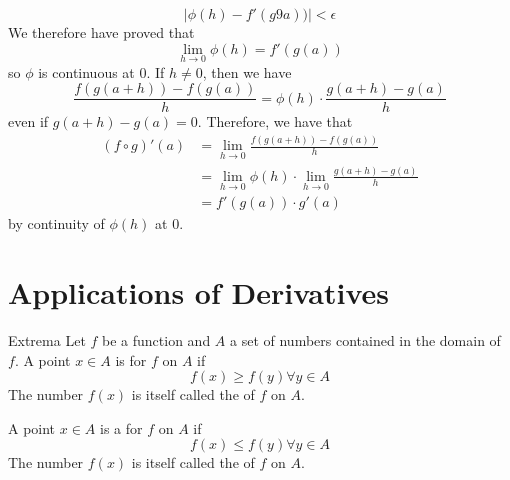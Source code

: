 \documentclass[12pt]{report}
\begin{document}
\begin{proof*}{}{}
\begin{equation*}
        |\phi(h) - f'(g9a))| < \epsilon
    \end{equation*}
    We therefore have proved that \begin{equation*}
        \lim\limits_{h\rightarrow 0}\phi(h) = f'(g(a))
    \end{equation*}
    so $\phi$ is continuous at $0$. If $h \neq 0$, then we have $$\frac{f(g(a+h)) - f(g(a))}{h} = \phi(h)\cdot \frac{g(a+h)-g(a)}{h}$$
    even if $g(a+h)-g(a) = 0$. Therefore, we have that \begin{align*}
        (f\circ g)'(a) &= \lim\limits_{h\rightarrow 0}\frac{f(g(a+h)) - f(g(a))}{h} \\
        &= \lim\limits_{h\rightarrow 0}\phi(h)\cdot \lim\limits_{h\rightarrow 0}\frac{g(a+h)-g(a)}{h} \\
        &= f'(g(a))\cdot g'(a) 
    \end{align*}
    by continuity of $\phi(h)$ at $0$.
\end{proof*}



\section{Applications of Derivatives}

\begin{defn}{Extrema}{}
    Let $f$ be a function and $A$ a set of numbers contained in the domain of $f$. A point $x \in A$ is  for $f$ on $A$ if \begin{equation}
        f(x) \geq f(y) \forall y \in A
    \end{equation}
    The number $f(x)$ is itself called the  of $f$ on $A$.

    A point $x \in A$ is a  for $f$ on $A$ if \begin{equation}
        f(x) \leq f(y) \forall y \in A
    \end{equation}
    The number $f(x)$ is itself called the  of $f$ on $A$.
\end{defn}
\end{document}
